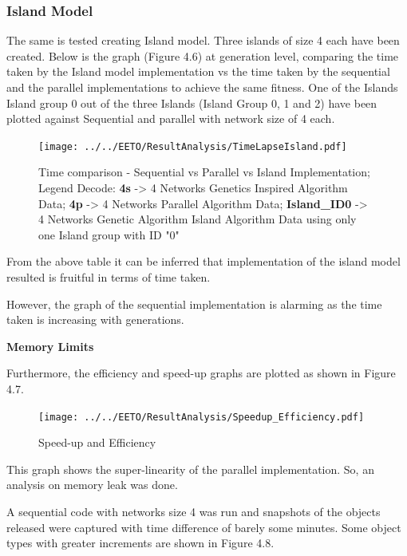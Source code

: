 \subsubsection{Island Model}


The same is tested creating Island model.
Three islands of size 4 each have been created. Below is the graph (Figure 4.6) at generation level, comparing the time taken by the Island model implementation vs the time taken by the sequential and the parallel implementations to achieve the same fitness.
One of the Islands Island group 0 out of the three Islands (Island Group 0, 1 and 2) have been plotted against Sequential and parallel with network size of 4 each.


\begin{figure}
	\texttt{[image: ../../EETO/ResultAnalysis/TimeLapseIsland.pdf]}
	\caption{Time comparison - Sequential vs Parallel vs Island Implementation; \newline Legend Decode: \newline \textbf{4s} -> 4 Networks Genetics Inspired Algorithm Data; \newline  \textbf{4p} -> 4 Networks Parallel Algorithm Data; \newline  \textbf{Island\_ID0} -> 4 Networks Genetic Algorithm Island Algorithm Data using only one Island group with ID "0"}
\end{figure}



From the above table it can be inferred that implementation of the island model resulted is fruitful in terms of time taken.

However, the graph of the sequential implementation is alarming as the time taken is increasing with generations.

\textbf{Memory Limits}

Furthermore, the efficiency and speed-up graphs are plotted as shown in Figure 4.7.

\begin{figure}
	\texttt{[image: ../../EETO/ResultAnalysis/Speedup\_Efficiency.pdf]}
	\caption{Speed-up and Efficiency}
\end{figure}

This graph shows the super-linearity of the parallel implementation.
So, an analysis on memory leak was done.

A sequential code with networks size 4 was run and snapshots of the objects released were captured with time difference of barely some minutes. Some object types with greater increments are shown in Figure 4.8.


